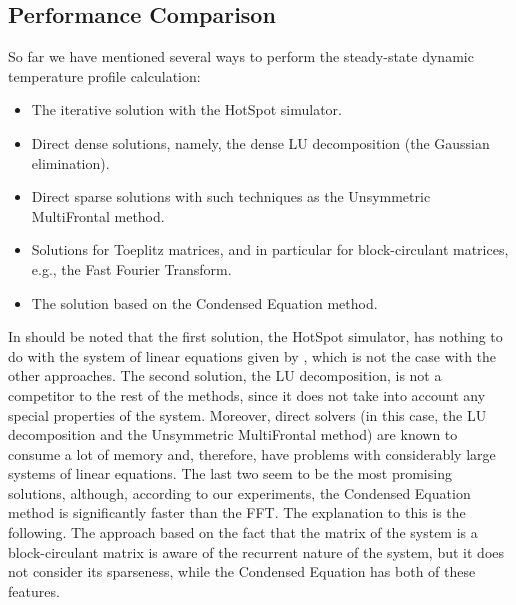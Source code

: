 \subsection{Performance Comparison}
So far we have mentioned several ways to perform the steady-state dynamic temperature profile calculation:
\begin{itemize}
  \item The iterative solution with the HotSpot simulator.
  \item Direct dense solutions, namely, the dense LU decomposition (the Gaussian elimination).
  \item Direct sparse solutions with such techniques as the Unsymmetric MultiFrontal method.
  \item Solutions for Toeplitz matrices, and in particular for block-circulant matrices, e.g., the Fast Fourier Transform.
  \item The solution based on the Condensed Equation method.
\end{itemize}

In should be noted that the first solution, the HotSpot simulator, has nothing to do with the system of linear equations given by , which is not the case with the other approaches. The second solution, the LU decomposition, is not a competitor to the rest of the methods, since it does not take into account any special properties of the system. Moreover, direct solvers (in this case, the LU decomposition and the Unsymmetric MultiFrontal method) are known to consume a lot of memory and, therefore, have problems with considerably large systems of linear equations. The last two seem to be the most promising solutions, although, according to our experiments, the Condensed Equation method is significantly faster than the FFT. The explanation to this is the following. The approach based on the fact that the matrix of the system is a block-circulant matrix is aware of the recurrent nature of the system, but it does not consider its sparseness, while the Condensed Equation has both of these features.

